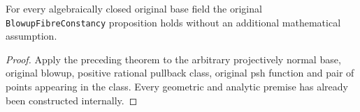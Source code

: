 \begin{corollary}
\label{cor:fc-original-blowup-fibre-constancy-class}
\leanok
{}
For every algebraically closed original base field the original
\texttt{BlowupFibreConstancy} proposition holds without an additional
mathematical assumption.
\end{corollary}
\begin{proof}
Apply the preceding theorem to the arbitrary projectively normal base,
original blowup, positive rational pullback class, original psh function
and pair of points appearing in the class. Every geometric and analytic
premise has already been constructed internally.
\end{proof}
